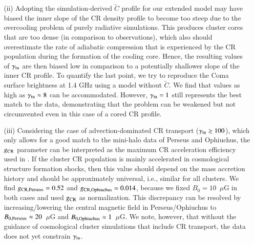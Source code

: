 \documentclass[useAMS,usenatbib]{mn2e}
\begin{document}
(ii) Adopting the simulation-derived $\tilde{C}$ profile
  \citep{2010MNRAS.409..449P} for our extended model may have biased the inner
  slope of the CR density profile to become too steep due to the overcooling
  problem of purely radiative simulations. This produces cluster cores that are
  too dense (in comparison to observations), which also should overestimate the
  rate of adiabatic compression that is experienced by the CR population during
  the formation of the cooling core. Hence, the resulting values of
  $\gamma_{{\mathrm{tu}}}$ are then biased low in comparison to a potentially
  shallower slope of the inner CR profile. To quantify the last point, we try to
  reproduce the Coma surface brightness at 1.4 GHz using a model without
  $\tilde{C}$. We find that values as high as $\gamma_{{\mathrm{tu}}} \approx 8$ can
  be accommodated. However, $\gamma_{{\mathrm{tu}}}=1$ still represents the best
  match to the data, demonstrating that the problem can be weakened but not
  circumvented even in this case of a cored CR profile. 

(iii) Considering the case of advection-dominated CR transport
  ($\gamma_{{\mathrm{tu}}}\gtrsim100$), which only allows for a good match to the
  mini-halo data of Perseus and Ophiuchus, the $g_{{\mathrm{CR}}}$ parameter can be
  interpreted as the maximum CR acceleration efficiency used in
  \cite{2010MNRAS.409..449P}. If the cluster CR population is mainly accelerated
  in cosmological structure formation shocks, then this value should depend on
  the mass accretion history and should be approximately universal, i.e.,
  similar for all clusters. We find $g_{{\mathrm{CR, Perseus}}} = 0.52$ and
  $g_{{\mathrm{CR, Ophiuchus}}} = 0.014$, because we fixed $B_{0}=10$~$\mu$G in both
  cases and used $g_{{\mathrm{CR}}}$ as normalization. This discrepancy can be
  resolved by increasing/lowering the central magnetic field in
  Perseus/Ophiuchus to $B_{0,{\mathrm{Perseus}}}\approx20$~$\mu$G and
  $B_{0,{\mathrm{Ophiuchus}}}\approx1$~$\mu$G. We note, however, that without the
  guidance of cosmological cluster simulations that include CR transport, the
  data does not yet constrain $\gamma_{{\mathrm{tu}}}$.
\end{document}
